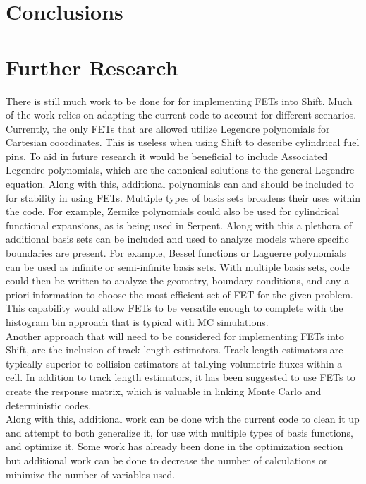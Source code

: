\documentclass[10tma4paper]{article}
\begin{document}
\section{Conclusions}\label{conclusion}

\section{Further Research}\label{further}
There is still much work to be done for for implementing FETs into Shift. Much of the work relies on adapting the current code to account for different scenarios. Currently, the only FETs that are allowed utilize Legendre polynomials for Cartesian coordinates. This is useless when using Shift to describe cylindrical fuel pins. To aid in future research it would be beneficial to include Associated Legendre polynomials, which are the canonical solutions to the general Legendre equation. Along with this, additional polynomials can and should be included to for stability in using FETs. Multiple types of basis sets broadens their uses within the code. For example, Zernike polynomials could also be used for cylindrical functional expansions, as is being used in Serpent. Along with this a plethora of additional basis sets can be included and used to analyze models where specific boundaries are present. For example, Bessel functions or Laguerre polynomials can be used as infinite or semi-infinite basis sets. With multiple basis sets, code could then be written to analyze the geometry, boundary conditions, and any a priori information to choose the most efficient set of FET for the given problem. This capability would allow FETs to be versatile enough to complete with the histogram bin approach that is typical with MC simulations.
\\
Another approach that will need to be considered for implementing FETs into Shift, are the inclusion of track length estimators. Track length estimators are typically superior to collision estimators at tallying volumetric fluxes within a cell. In addition to track length estimators, it has been suggested to use FETs to create the response matrix, which is valuable in linking Monte Carlo and deterministic codes.
\\
Along with this, additional work can be done with the current code to clean it up and attempt to both generalize it, for use with multiple types of basis functions, and optimize it. Some work has already been done in the optimization section but additional work can be done to decrease the number of calculations or minimize the number of variables used.
\end{document}
